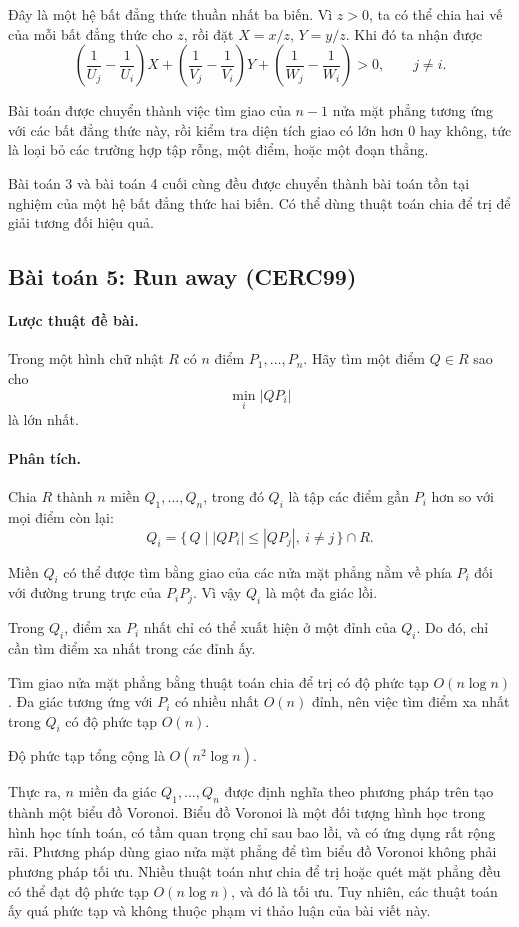 \documentclass[11pt]{article}
\begin{document}
Đây là một hệ bất đẳng thức thuần nhất ba biến. Vì \(z>0\), ta có thể chia
hai vế của mỗi bất đẳng thức cho \(z\), rồi đặt \(X=x/z\), \(Y=y/z\). Khi đó
ta nhận được
\[
  \left(\frac{1}{U_j}-\frac{1}{U_i}\right)X
  +\left(\frac{1}{V_j}-\frac{1}{V_i}\right)Y
  +\left(\frac{1}{W_j}-\frac{1}{W_i}\right)>0,
  \qquad j\ne i.
\]

Bài toán được chuyển thành việc tìm giao của \(n-1\) nửa mặt phẳng tương ứng
với các bất đẳng thức này, rồi kiểm tra diện tích giao có lớn hơn \(0\) hay
không, tức là loại bỏ các trường hợp tập rỗng, một điểm, hoặc một đoạn thẳng.

Bài toán 3 và bài toán 4 cuối cùng đều được chuyển thành bài toán tồn tại
nghiệm của một hệ bất đẳng thức hai biến. Có thể dùng thuật toán chia để trị
để giải tương đối hiệu quả.

\subsection{Bài toán 5: Run away (CERC99)}

\paragraph{Lược thuật đề bài.}
Trong một hình chữ nhật \(R\) có \(n\) điểm \(P_1,\ldots,P_n\). Hãy tìm một
điểm \(Q\in R\) sao cho
\[
  \min_i |QP_i|
\]
là lớn nhất.

\paragraph{Phân tích.}
Chia \(R\) thành \(n\) miền \(Q_1,\ldots,Q_n\), trong đó \(Q_i\) là tập các
điểm gần \(P_i\) hơn so với mọi điểm còn lại:
\[
  Q_i=\{\,Q\mid |QP_i|\le |QP_j|,\ i\ne j\,\}\cap R.
\]

Miền \(Q_i\) có thể được tìm bằng giao của các nửa mặt phẳng nằm về phía
\(P_i\) đối với đường trung trực của \(P_iP_j\). Vì vậy \(Q_i\) là một đa
giác lồi.

Trong \(Q_i\), điểm xa \(P_i\) nhất chỉ có thể xuất hiện ở một đỉnh của
\(Q_i\). Do đó, chỉ cần tìm điểm xa nhất trong các đỉnh ấy.

Tìm giao nửa mặt phẳng bằng thuật toán chia để trị có độ phức tạp
\(O(n\log n)\). Đa giác tương ứng với \(P_i\) có nhiều nhất \(O(n)\) đỉnh,
nên việc tìm điểm xa nhất trong \(Q_i\) có độ phức tạp \(O(n)\).

Độ phức tạp tổng cộng là \(O(n^2\log n)\).

Thực ra, \(n\) miền đa giác \(Q_1,\ldots,Q_n\) được định nghĩa theo phương
pháp trên tạo thành một biểu đồ Voronoi. Biểu đồ Voronoi là một đối tượng
hình học trong hình học tính toán, có tầm quan trọng chỉ sau bao lồi, và có
ứng dụng rất rộng rãi. Phương pháp dùng giao nửa mặt phẳng để tìm biểu đồ
Voronoi không phải phương pháp tối ưu. Nhiều thuật toán như chia để trị hoặc
quét mặt phẳng đều có thể đạt độ phức tạp \(O(n\log n)\), và đó là tối ưu.
Tuy nhiên, các thuật toán ấy quá phức tạp và không thuộc phạm vi thảo luận
của bài viết này.
\end{document}
